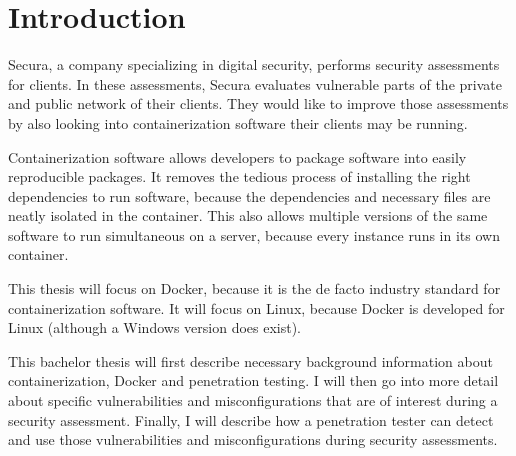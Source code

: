 \chapter{Introduction}

Secura, a company specializing in digital security, performs security assessments for clients. In these assessments, Secura evaluates vulnerable parts of the private and public network of their clients. They would like to improve those assessments by also looking into containerization software their clients may be running.

\hfill

Containerization software allows developers to package software into easily reproducible packages.
It removes the tedious process of installing the right dependencies to run software, because the dependencies and necessary files are neatly isolated in the container. This also allows multiple versions of the same software to run simultaneous on a server, because every instance runs in its own container.

\hfill

This thesis will focus on Docker, because it is the de facto industry standard for containerization software. It will focus on Linux, because Docker is developed for Linux (although a Windows version does exist).

\hfill

This bachelor thesis will first describe necessary background information about containerization, Docker and penetration testing. I will then go into more detail about specific vulnerabilities and misconfigurations that are of interest during a security assessment. Finally, I will describe how a penetration tester can detect and use those vulnerabilities and misconfigurations during security assessments.
